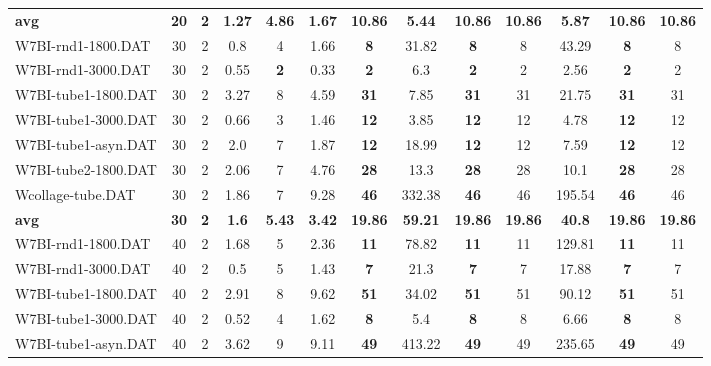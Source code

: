 \begin{table}[h]
{\begin{tabular}{lcccccccccccc}
\cline{1-13} \textbf{avg} & \textbf{20} & \textbf{2} & \textbf{1.27} & \textbf{4.86} & \textbf{1.67} & \textbf{10.86} & \textbf{5.44} & \textbf{10.86} & \textbf{10.86} & \textbf{5.87} & \textbf{10.86} & \textbf{10.86} \\ \cline{1-13}
W7BI-rnd1-1800.DAT & 30 & 2 &  \textcolor{blue2}{0.8} & 4 & 1.66 &  \textbf{8} & 31.82 &  \textbf{8} & 8 & 43.29 &  \textbf{8} & 8 \\
W7BI-rnd1-3000.DAT & 30 & 2 & 0.55 &  \textbf{2} &  \textcolor{blue2}{0.33} &  \textbf{2} & 6.3 &  \textbf{2} & 2 & 2.56 &  \textbf{2} & 2 \\
W7BI-tube1-1800.DAT & 30 & 2 &  \textcolor{blue2}{3.27} & 8 & 4.59 &  \textbf{31} & 7.85 &  \textbf{31} & 31 & 21.75 &  \textbf{31} & 31 \\
W7BI-tube1-3000.DAT & 30 & 2 &  \textcolor{blue2}{0.66} & 3 & 1.46 &  \textbf{12} & 3.85 &  \textbf{12} & 12 & 4.78 &  \textbf{12} & 12 \\
W7BI-tube1-asyn.DAT & 30 & 2 & 2.0 & 7 &  \textcolor{blue2}{1.87} &  \textbf{12} & 18.99 &  \textbf{12} & 12 & 7.59 &  \textbf{12} & 12 \\
W7BI-tube2-1800.DAT & 30 & 2 &  \textcolor{blue2}{2.06} & 7 & 4.76 &  \textbf{28} & 13.3 &  \textbf{28} & 28 & 10.1 &  \textbf{28} & 28 \\
Wcollage-tube.DAT & 30 & 2 &  \textcolor{blue2}{1.86} & 7 & 9.28 &  \textbf{46} & 332.38 &  \textbf{46} & 46 & 195.54 &  \textbf{46} & 46 \\
\cline{1-13} \textbf{avg} & \textbf{30} & \textbf{2} & \textbf{1.6} & \textbf{5.43} & \textbf{3.42} & \textbf{19.86} & \textbf{59.21} & \textbf{19.86} & \textbf{19.86} & \textbf{40.8} & \textbf{19.86} & \textbf{19.86} \\ \cline{1-13}
W7BI-rnd1-1800.DAT & 40 & 2 &  \textcolor{blue2}{1.68} & 5 & 2.36 &  \textbf{11} & 78.82 &  \textbf{11} & 11 & 129.81 &  \textbf{11} & 11 \\
W7BI-rnd1-3000.DAT & 40 & 2 &  \textcolor{blue2}{0.5} & 5 & 1.43 &  \textbf{7} & 21.3 &  \textbf{7} & 7 & 17.88 &  \textbf{7} & 7 \\
W7BI-tube1-1800.DAT & 40 & 2 &  \textcolor{blue2}{2.91} & 8 & 9.62 &  \textbf{51} & 34.02 &  \textbf{51} & 51 & 90.12 &  \textbf{51} & 51 \\
W7BI-tube1-3000.DAT & 40 & 2 &  \textcolor{blue2}{0.52} & 4 & 1.62 &  \textbf{8} & 5.4 &  \textbf{8} & 8 & 6.66 &  \textbf{8} & 8 \\
W7BI-tube1-asyn.DAT & 40 & 2 &  \textcolor{blue2}{3.62} & 9 & 9.11 &  \textbf{49} & 413.22 &  \textbf{49} & 49 & 235.65 &  \textbf{49} & 49 \\

\end{tabular}}
\end{table}
